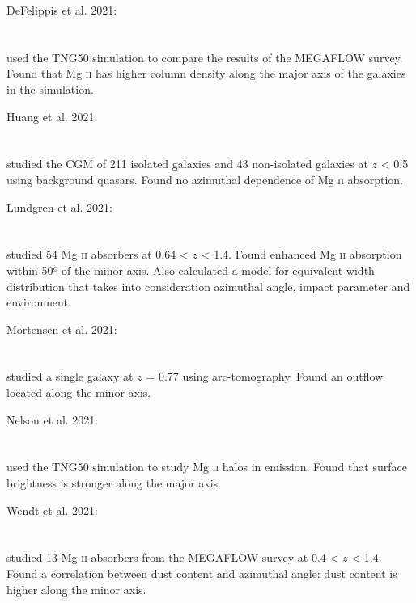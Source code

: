 \hline

DeFelippis et al. 2021: \\
\citet{2021arXiv210208383D} \\
\citep{2021arXiv210208383D} \\
used the TNG50 simulation to compare the results of the MEGAFLOW survey. Found
that Mg \textsc{ii} has higher column density along the major axis of the
galaxies in the simulation. \\

\hline

Huang et al. 2021: \\
\citet{2021MNRAS.502.4743H} \\
\citep{2021MNRAS.502.4743H} \\
studied the CGM of 211 isolated galaxies and 43 non-isolated galaxies at
$z$ < 0.5 using background quasars. Found no azimuthal dependence of
Mg \textsc{ii} absorption. \\

\hline

Lundgren et al. 2021: \\
\citet{2021ApJ...913...50L} \\
\citep{2021ApJ...913...50L} \\
studied 54 Mg \textsc{ii} absorbers at 0.64 < $z$ < 1.4. Found enhanced
Mg \textsc{ii} absorption within 50º of the minor axis. Also calculated a model
for equivalent width distribution that takes into consideration azimuthal angle,
impact parameter and environment.

\hline

Mortensen et al. 2021: \\
\citet{2021ApJ...914...92M} \\
\citep{2021ApJ...914...92M} \\
studied a single galaxy at $z$ = 0.77 using arc-tomography. Found an outflow
located along the minor axis. \\

\hline

Nelson et al. 2021: \\
\citet{2021MNRAS.507.4445N} \\
\citep{2021MNRAS.507.4445N} \\
used the TNG50 simulation to study Mg \textsc{ii} halos in emission. Found that
surface brightness is stronger along the major axis. \\

\hline

Wendt et al. 2021: \\
\citet{2021MNRAS.502.3733W} \\
\citep{2021MNRAS.502.3733W} \\
studied 13 Mg \textsc{ii} absorbers from the MEGAFLOW survey at 0.4 < $z$ < 1.4.
Found a correlation between dust content and azimuthal angle: dust content is
higher along the minor axis. \\

